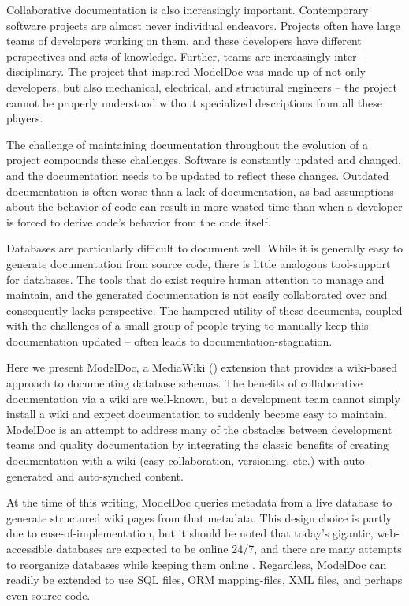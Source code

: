 \documentclass{acm_proc_article-sp}
\begin{document}
Collaborative documentation is also increasingly important. 
Contemporary software projects are almost never individual endeavors. Projects
often have large teams of developers working on them, and these developers have
different perspectives and sets of knowledge.  Further, teams are increasingly
inter-disciplinary.  The project that inspired ModelDoc was made up of not only
developers, but also mechanical, electrical, and structural engineers -- the project cannot be properly understood without specialized descriptions from all these players.

The challenge of maintaining documentation throughout the evolution of a
project compounds these challenges.  Software is constantly updated and
changed, and the documentation needs to be updated to reflect these changes.
 Outdated documentation is often worse than a lack of documentation, as bad
assumptions about the behavior of code can result in more wasted time than
when a developer is forced to derive code's behavior from the code itself.

Databases are particularly difficult to document well.  While it is generally
easy to generate documentation from source code, there is little analogous
tool-support for databases.  The tools that do exist require human attention to
manage and maintain, and the generated documentation is not easily collaborated
over and consequently lacks perspective. The hampered utility of these
documents, coupled with the challenges of a small group of people trying to
manually keep this documentation updated -- often leads to
documentation-stagnation.

Here we present ModelDoc, a MediaWiki (\cite{web:mediawiki}) extension that
provides a wiki-based approach to documenting database schemas.  The benefits of collaborative
documentation via a wiki are well-known, but a development team cannot simply install a wiki
and expect documentation to suddenly become easy to maintain.  ModelDoc is an
attempt to address many of the obstacles between development teams and quality
documentation by integrating the classic benefits of creating documentation
with a wiki (easy collaboration, versioning, etc.) with auto-generated and
auto-synched content.

At the time of this writing, ModelDoc queries metadata from a live database to
generate structured wiki pages from that metadata.  This design choice is
partly due to ease-of-implementation, but it should be noted that today's
gigantic, web-accessible databases are expected to be online 24/7, and there
are many attempts to reorganize databases while keeping them online
\cite{sockut:reorganization} \cite{curino:evolution}.  Regardless, ModelDoc can
readily be extended to use SQL files, ORM mapping-files, XML files, and perhaps
even source code.
\end{document}

